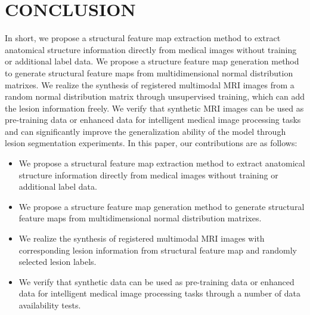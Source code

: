 \documentclass[runningheads]{llncs}
\begin{document}
\section{CONCLUSION}
In short, we propose a structural feature map extraction method to extract anatomical structure information directly from medical images without training or additional label data.
We propose a structure feature map generation method to generate structural feature maps from multidimensional normal distribution matrixes.
We realize the synthesis of registered multimodal MRI images from a random normal distribution matrix through unsupervised training, which can add the lesion information freely.
We verify that synthetic MRI images can be used as pre-training data or enhanced data for intelligent medical image processing tasks and can significantly improve the generalization ability of the model through lesion segmentation experiments.
\iffalse
In this paper, our contributions are as follows:
\begin{itemize}
	\item We propose a structural feature map extraction method to extract anatomical structure information directly from medical images without training or additional label data.
	\item We propose a structure feature map generation method to generate structural feature maps from multidimensional normal distribution matrixes.
	\item We realize the synthesis of registered multimodal MRI images with corresponding lesion information from structural feature map and randomly selected lesion labels.
	\item We verify that synthetic data can be used as pre-training data or enhanced data for intelligent medical image processing tasks through a number of data availability tests.
\end{itemize}
%
%
%


\end{document}
